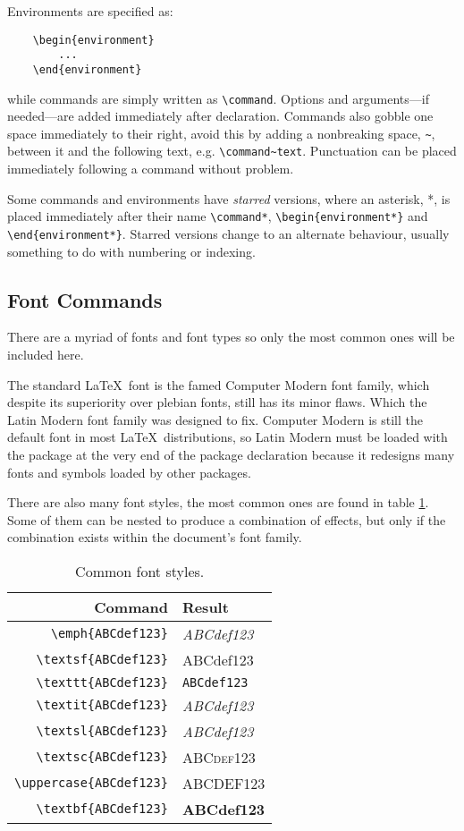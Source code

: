 Environments are specified as:
\begin{verbatim}
	\begin{environment}
	    ...
	\end{environment}
\end{verbatim}
while commands are simply written as \verb|\command|.  Options and
arguments---if needed---are added immediately after declaration.
Commands also gobble one space immediately to their right, avoid this
by adding a nonbreaking space, \verb|~|, between it and the following
text, e.g. \verb|\command~text|.  Punctuation can be placed
immediately following a command without problem.

Some commands and environments have \emph{starred} versions, where an
asterisk, *, is placed immediately after their name \verb|\command*|,
\verb|\begin{environment*}| and \verb|\end{environment*}|.  Starred
versions change to an alternate behaviour, usually something to do
with numbering or indexing.
%
\subsection{Font Commands}
%
There are a myriad of fonts and font types so only the most common
ones will be included here.

The standard \LaTeX~font is the famed Computer Modern font family,
which despite its superiority over plebian fonts, still has its minor
flaws.  Which the Latin Modern font family was designed to fix.
Computer Modern is still the default font in most
\LaTeX~distributions, so Latin Modern must be loaded with the
 package at the very end of the package declaration
because it redesigns many fonts and symbols loaded by other packages.

There are also many font styles, the most common ones are found in
table \ref{t:font}.  Some of them can be nested to produce a
combination of effects, but only if the combination exists within the
document's font family.
\begin{table}[!htbp]
  \centering
  \caption{Common font styles.}
  \label{t:font}
  \begin{tabular}{rl}
    \toprule
    Command & Result \\
    \midrule
    \verb|\emph{ABCdef123}| & \emph{ABCdef123}  \\
    \verb|\textsf{ABCdef123}| & \textsf{ABCdef123} \\
    \verb|\texttt{ABCdef123}| & \texttt{ABCdef123} \\
    \verb|\textit{ABCdef123}| & \textit{ABCdef123} \\
    \verb|\textsl{ABCdef123}| & \textsl{ABCdef123} \\
    \verb|\textsc{ABCdef123}| & \textsc{ABCdef123}  \\
    \verb|\uppercase{ABCdef123}| & \uppercase{ABCdef123} \\
    \verb|\textbf{ABCdef123}| & \textbf{ABCdef123} \\
    \bottomrule
  \end{tabular}
\end{table}

